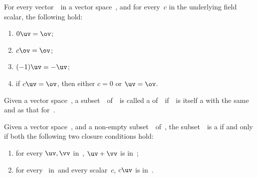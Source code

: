 \begin{draft}
\begin{theorem}\label{thm:avssvx}
For every vector~\uv\ in a vector space~\VV, and for every~\(c\) in the underlying field scalar, the following hold:
\begin{enumerate}
\item \(0\uv=\ov\);
\item \(c\ov=\ov\);
\item \((-1)\uv=-\uv\); 
\item if \(c\uv=\ov\), then either \(c=0\) or \(\uv=\ov\).
\end{enumerate}
\end{theorem}



\begin{definition}[subspace] \label{def:avsss} %
Given a vector space~\VV, a subset~\WW\ of~\VV\ is called a  of~\VV\ if~\WW\ is itself a  with the same  and  as that for~\VV.
\end{definition}


\begin{theorem} \label{thm:avsss} %
Given a vector space~\VV, and a non-empty subset~\WW\ of~\VV,
the subset~\WW\ is a  if and only if both the following two closure conditions hold:
\begin{enumerate}
\item for every \(\uv,\vv\) in~\WW, \(\uv+\vv\) is in~\WW;
\item for every \uv~in\WW\ and every scalar~\(c\), \(c\uv\) is in~\WW.
\end{enumerate}
\end{theorem}


\begin{comment}
\ov\ is in every subspace.
Spanning sets.
\end{comment}




\sectionExercises

\end{draft}
